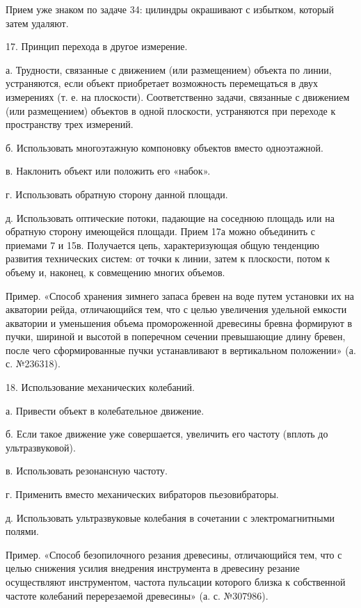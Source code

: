 Прием уже знаком по задаче 34: цилиндры окрашивают с избытком, который
затем удаляют.

17. Принцип перехода в другое измерение.

а.  Трудности,  связанные с  движением  (или  размещением) объекта  по
линии, устраняются, если объект приобретает возможность перемещаться в
двух измерениях (т. е. на плоскости). Соответственно задачи, связанные
с движением (или размещением)  объектов в одной плоскости, устраняются
при переходе к пространству трех измерений.

б. Использовать многоэтажную компоновку объектов вместо одноэтажной.

в. Наклонить объект или положить его «набок».

г. Использовать обратную сторону данной площади.

д. Использовать оптические потоки, падающие на соседнюю площадь или на
обратную  сторону  имеющейся площади.  Прием  17а  можно объединить  с
приемами  7 и  15в. Получается  цепь, характеризующая  общую тенденцию
развития  технических систем:  от точки  к линии,  затем к  плоскости,
потом к объему и, наконец, к совмещению многих объемов.

Пример. «Способ хранения зимнего запаса бревен на воде путем установки
их  на  акватории рейда,  отличающийся  тем,  что с  целью  увеличения
удельной   емкости  акватории   и   уменьшения  объема   промороженной
древесины бревна  формируют в  пучки, шириной  и высотой  в поперечном
сечении  превышающие длину  бревен,  после  чего сформированные  пучки
устанавливают в вертикальном положении» (а. с. №236318).


18. Использование механических колебаний.

а. Привести объект в колебательное движение.

б. Если такое движение уже  совершается, увеличить его частоту (вплоть
до ультразвуковой).

в. Использовать резонансную частоту.

г. Применить вместо механических вибраторов пьезовибраторы.

д.    Использовать   ультразвуковые    колебания    в   сочетании    с
электромагнитными полями.

Пример.  «Способ безопилочного  резания  древесины, отличающийся  тем,
что  с  целью  снижения   усилия  внедрения  инструмента  в  древесину
резание осуществляют инструментом, частота пульсации которого близка к
собственной частоте колебаний перерезаемой древесины» (а. с. №307986).

